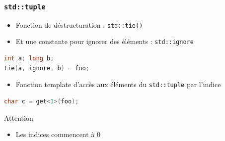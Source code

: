 \documentclass[C++.tex]{subfiles}
\begin{document}
\begin{frame}[fragile]
	\frametitle{\lstinline|std::tuple|}
	\begin{itemize}
		\item Fonction de déstructuration : \lstinline|std::tie()|
		\item Et une constante pour ignorer des éléments : \lstinline|std::ignore|
	\end{itemize}

	\begin{lstlisting}[language=C++]
int a; long b;
tie(a, ignore, b) = foo;\end{lstlisting}


	\begin{itemize}
		\item Fonction template d'accès aux éléments du \lstinline|std::tuple| par l'indice
	\end{itemize}

	\begin{lstlisting}[language=C++]
char c = get<1>(foo);\end{lstlisting}

	\begin{alertblock}{Attention}
		\begin{itemize}
			\item Les indices commencent à 0
		\end{itemize}
	\end{alertblock}
\end{frame}
\end{document}

